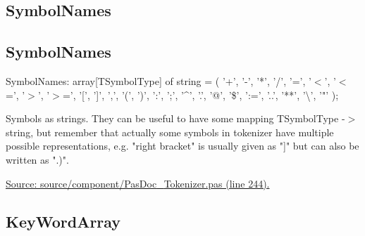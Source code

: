 \documentclass{report}
\newif\ifpdf
\begin{document}
\subsection*{\large{\textbf{SymbolNames}}\normalsize\hspace{1ex}\hrulefill}
\else
\subsection*{SymbolNames}
\fi
\label{PasDoc_Tokenizer-SymbolNames}
\begin{list}{}{
\setlength{\itemindent}{0cm}
\setlength{\listparindent}{0cm}
\setlength{\leftmargin}{\evensidemargin}
\addtolength{\leftmargin}{\tmplength}
\settowidth{\labelsep}{X}
\addtolength{\leftmargin}{\labelsep}
\setlength{\labelwidth}{\tmplength}
}
\item[\textbf{Declaration}\hfill]
\ifpdf
\begin{flushleft}
\fi
\begin{ttfamily}
SymbolNames: array[TSymbolType] of string =
  ( '+', '-', '*', '/', '=', '{$<$}', '{$<$}=', '{$>$}', '{$>$}=', '[', ']', ',',
    '(', ')', ':', ';', '{\^{}}', '.', '@', '{\$}', ':=', '..', '**', '{\textbackslash}', '"' );\end{ttfamily}

\ifpdf
\end{flushleft}
\fi

\par
\item[\textbf{Description}]
Symbols as strings. They can be useful to have some mapping TSymbolType {-}{$>$} string, but remember that actually some symbols in tokenizer have multiple possible representations, e.g. "right bracket" is usually given as "]" but can also be written as ".)".\par
\href{https://github.com/pasdoc/pasdoc/blob/master/source/component/PasDoc_Tokenizer.pas#L244}{Source: source/component/PasDoc{\_}Tokenizer.pas (line 244).}

\end{list}
\ifpdf
\subsection*{\large{\textbf{KeyWordArray}}\normalsize\hspace{1ex}\hrulefill}
\else
\end{document}
